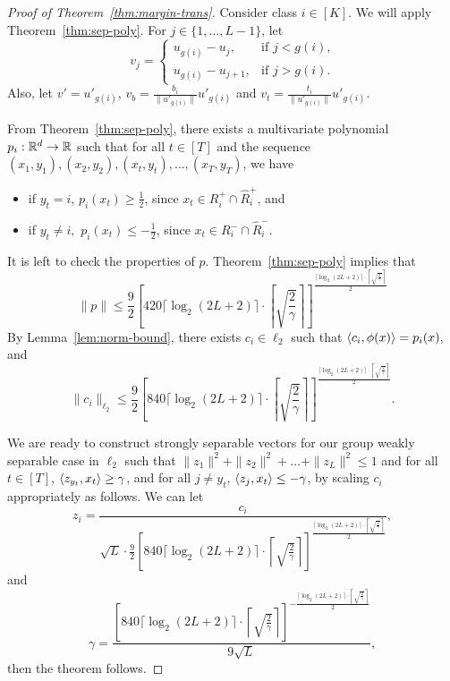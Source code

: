 \begin{proof}[Proof of Theorem~\ref{thm:margin-trans}]

Consider class $i\in[K]$. We will apply
Theorem~\ref{thm:sep-poly}. For $j\in\{1,\ldots,L-1\}$, let
\[
v_j=\left\{
\begin{array}{ll}
    u_{g(i)}-u_j, & \mbox{if $j<g(i)$,} \\
    u_{g(i)}-u_{j+1}, & \mbox{if $j>g(i)$.}
\end{array}
\right.    
\]
Also, let $v'=u'_{g(i)}$, $v_b=\frac{b_i}{\|u'_{g(i)}\|}u'_{g(i)}$
and $v_t=\frac{t_i}{\|u'_{g(i)}\|}u'_{g(i)}$.

From Theorem~\ref{thm:sep-poly}, there exists a multivariate
polynomial $p_i:{\mathbb{R}}^d\to {\mathbb{R}}$ such that for all $t\in[T]$ and the
sequence $(x_1,y_1),(x_2,y_2),(x_t,y_t),\ldots,(x_T,y_T)$, we have
\begin{itemize}
\item if $y_t=i$, $p_i(x_t)\geq \frac{1}{2}$, since $x_t\in R^{+}_i
    \cap \hat{R}^{+}_i$, and
\item if $y_t\neq i,$ $p_i(x_t)\leq -\frac{1}{2}$, since $x_t\in
    R^{-}_i \cap \hat{R}^{-}_i$.
\end{itemize}

It is left to check the properties of $p$.
Theorem~\ref{thm:sep-poly} implies that
\[
\|p\|\leq \frac{9}{2}\left[420\lceil\log_2(2L+2)\rceil\cdot\left\lceil\sqrt{\frac{2}{\gamma}}\right\rceil\right]^{\frac{\lceil\log_2(2L+2)\rceil\cdot\left\lceil\sqrt{\frac{2}{\gamma}}\right\rceil}{2}}
\]
By Lemma~\ref{lem:norm-bound}, there exists $c_i\in\ell_2$ such that $\langle c_i,\phi(x)\rangle=p_i(x),$ and
\[
\|c_i\|_{\ell_2}\leq \frac{9}{2}\left[840\lceil\log_2(2L+2)\rceil\cdot\left\lceil\sqrt{\frac{2}{\gamma}}\right\rceil\right]^{\frac{\lceil\log_2(2L+2)\rceil\cdot\left\lceil\sqrt{\frac{2}{\gamma}}\right\rceil}{2}}.
\]

We are ready to construct strongly separable vectors for our group
weakly separable case in $\ell_2$ such that
$\|z_1\|^2+\|z_2\|^2+\ldots+\|z_L\|^2\leq 1$ and for all $t\in [T]$,
$\langle z_{y_t},x_t\rangle \geq \gamma$, and for all $j\neq y_t$,
$\langle z_j,x_t\rangle\leq -\gamma$, by scaling $c_i$ appropriately as
follows.  We can let
\[
z_i=\frac{c_i}{\sqrt{L}\cdot \frac{9}{2}\left[840\lceil\log_2(2L+2)\rceil\cdot\left\lceil\sqrt{\frac{2}{\gamma}}\right\rceil\right]^{\frac{\lceil\log_2(2L+2)\rceil\cdot\left\lceil\sqrt{\frac{2}{\gamma}}\right\rceil}{2}}},
\]
and
\[
\gamma = \frac{\left[840\lceil\log_2(2L+2)\rceil\cdot\left\lceil\sqrt{\frac{2}{\gamma}}\right\rceil\right]^{-\frac{\lceil\log_2(2L+2)\rceil\cdot\left\lceil\sqrt{\frac{2}{\gamma}}\right\rceil}{2}}}{9\sqrt{L}},
\]
then the theorem follows.    
\end{proof}

